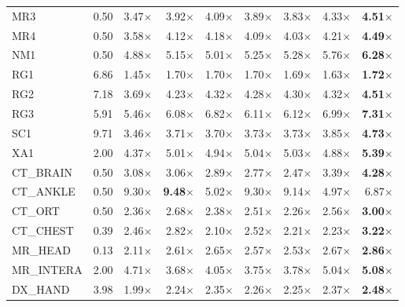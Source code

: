 \documentclass[journal]{IEEEtran}
\begin{document}
\begin{table}[t]
\begin{tabular}{lrrrrrrrr}
MR3            & 0.50 & 3.47$\times$ & 3.92$\times$ & 4.09$\times$ & 3.89$\times$ & 3.83$\times$ & 4.33$\times$ & \textbf{4.51$\times$} \\
MR4            & 0.50 & 3.58$\times$ & 4.12$\times$ & 4.18$\times$ & 4.09$\times$ & 4.03$\times$ & 4.21$\times$ & \textbf{4.49$\times$} \\
NM1            & 0.50 & 4.88$\times$ & 5.15$\times$ & 5.01$\times$ & 5.25$\times$ & 5.28$\times$ & 5.76$\times$ & \textbf{6.28$\times$} \\
RG1            & 6.86 & 1.45$\times$ & 1.70$\times$ & 1.70$\times$ & 1.70$\times$ & 1.69$\times$ & 1.63$\times$ & \textbf{1.72$\times$} \\
RG2            & 7.18 & 3.69$\times$ & 4.23$\times$ & 4.32$\times$ & 4.28$\times$ & 4.30$\times$ & 4.32$\times$ & \textbf{4.51$\times$} \\
RG3            & 5.91 & 5.46$\times$ & 6.08$\times$ & 6.82$\times$ & 6.11$\times$ & 6.12$\times$ & 6.99$\times$ & \textbf{7.31$\times$} \\
SC1            & 9.71 & 3.46$\times$ & 3.71$\times$ & 3.70$\times$ & 3.73$\times$ & 3.73$\times$ & 3.85$\times$ & \textbf{4.73$\times$} \\
XA1            & 2.00 & 4.37$\times$ & 5.01$\times$ & 4.94$\times$ & 5.04$\times$ & 5.03$\times$ & 4.88$\times$ & \textbf{5.39$\times$} \\
CT\_BRAIN      & 0.50 & 3.08$\times$ & 3.06$\times$ & 2.89$\times$ & 2.77$\times$ & 2.47$\times$ & 3.39$\times$ & \textbf{4.28$\times$} \\
CT\_ANKLE      & 0.50 & 9.30$\times$ & \textbf{9.48$\times$} & 5.02$\times$ & 9.30$\times$ & 9.14$\times$ & 4.97$\times$ & 6.87$\times$ \\
CT\_ORT        & 0.50 & 2.36$\times$ & 2.68$\times$ & 2.38$\times$ & 2.51$\times$ & 2.26$\times$ & 2.56$\times$ & \textbf{3.00$\times$} \\
CT\_CHEST      & 0.39 & 2.46$\times$ & 2.82$\times$ & 2.10$\times$ & 2.52$\times$ & 2.21$\times$ & 2.23$\times$ & \textbf{3.22$\times$} \\
MR\_HEAD       & 0.13 & 2.11$\times$ & 2.61$\times$ & 2.65$\times$ & 2.57$\times$ & 2.53$\times$ & 2.67$\times$ & \textbf{2.86$\times$} \\
MR\_INTERA     & 2.00 & 4.71$\times$ & 3.68$\times$ & 4.05$\times$ & 3.75$\times$ & 3.78$\times$ & 5.04$\times$ & \textbf{5.08$\times$} \\
DX\_HAND       & 3.98 & 1.99$\times$ & 2.24$\times$ & 2.35$\times$ & 2.26$\times$ & 2.25$\times$ & 2.37$\times$ & \textbf{2.48$\times$} \\

\end{tabular}
\end{table}
\end{document}
